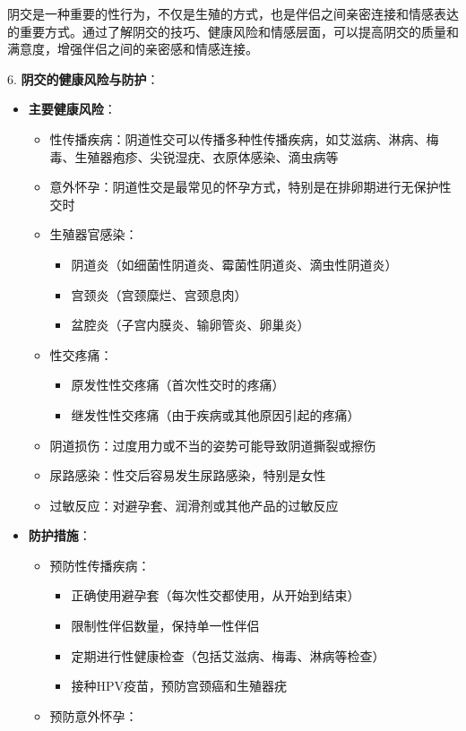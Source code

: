 \documentclass[12pt,UTF8]{ctexbook}
\begin{document}
阴交是一种重要的性行为，不仅是生殖的方式，也是伴侣之间亲密连接和情感表达的重要方式。通过了解阴交的技巧、健康风险和情感层面，可以提高阴交的质量和满意度，增强伴侣之间的亲密感和情感连接。

6. \textbf{阴交的健康风险与防护}：
\begin{itemize}
	\item \textbf{主要健康风险}：
	\begin{itemize}
		\item 性传播疾病：阴道性交可以传播多种性传播疾病，如艾滋病、淋病、梅毒、生殖器疱疹、尖锐湿疣、衣原体感染、滴虫病等
		\item 意外怀孕：阴道性交是最常见的怀孕方式，特别是在排卵期进行无保护性交时
		\item 生殖器官感染：
		\begin{itemize}
			\item 阴道炎（如细菌性阴道炎、霉菌性阴道炎、滴虫性阴道炎）
			\item 宫颈炎（宫颈糜烂、宫颈息肉）
			\item 盆腔炎（子宫内膜炎、输卵管炎、卵巢炎）
		\end{itemize}
		\item 性交疼痛：
		\begin{itemize}
			\item 原发性性交疼痛（首次性交时的疼痛）
			\item 继发性性交疼痛（由于疾病或其他原因引起的疼痛）
		\end{itemize}
		\item 阴道损伤：过度用力或不当的姿势可能导致阴道撕裂或擦伤
		\item 尿路感染：性交后容易发生尿路感染，特别是女性
		\item 过敏反应：对避孕套、润滑剂或其他产品的过敏反应
	\end{itemize}
	\item \textbf{防护措施}：
	\begin{itemize}
		\item 预防性传播疾病：
		\begin{itemize}
			\item 正确使用避孕套（每次性交都使用，从开始到结束）
			\item 限制性伴侣数量，保持单一性伴侣
			\item 定期进行性健康检查（包括艾滋病、梅毒、淋病等检查）
			\item 接种HPV疫苗，预防宫颈癌和生殖器疣
		\end{itemize}
		\item 预防意外怀孕：
		\begin{itemize}

\end{itemize}
\end{itemize}
\end{itemize}
\end{document}
